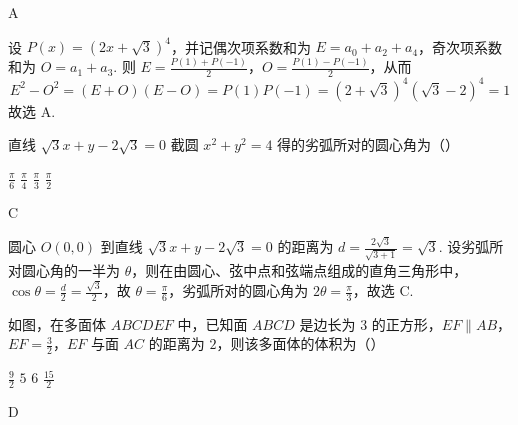 \documentclass[UTF8,a4paper,oneside,11pt]{ctexbook}
\begin{document}
\begin{answer}
A
\end{answer}

\begin{solution}
设 \(P(x)=(2x+\sqrt{3})^4\)，并记偶次项系数和为 \(E=a_0+a_2+a_4\)，奇次项系数和为 \(O=a_1+a_3\). 则
\(E=\frac{P(1)+P(-1)}{2}\)，\(O=\frac{P(1)-P(-1)}{2}\)，从而
\[
E^2-O^2=(E+O)(E-O)=P(1)P(-1)=(2+\sqrt{3})^4(\sqrt{3}-2)^4=1
\]
故选 A.
\end{solution}

\begin{problem}
直线 \(\sqrt{3}x+y-2\sqrt{3}=0\) 截圆 \(x^{2}+y^{2}=4\) 得的劣弧所对的圆心角为（\quad）

\choices
    {\(\frac{\pi}{6}\)}
    {\(\frac{\pi}{4}\)}
    {\(\frac{\pi}{3}\)}
    {\(\frac{\pi}{2}\)}
\end{problem}

\begin{answer}
C
\end{answer}

\begin{solution}
圆心 \(O(0,0)\) 到直线 \(\sqrt{3}x+y-2\sqrt{3}=0\) 的距离为
\(d=\frac{2\sqrt{3}}{\sqrt{3+1}}=\sqrt{3}\).
设劣弧所对圆心角的一半为 \(\theta\)，则在由圆心、弦中点和弦端点组成的直角三角形中，
\(\cos\theta=\frac{d}{2}=\frac{\sqrt{3}}{2}\)，故 \(\theta=\frac{\pi}{6}\)，劣弧所对的圆心角为 \(2\theta=\frac{\pi}{3}\)，故选 C.
\end{solution}

\begin{problem}
如图，在多面体 \(ABCDEF\) 中，已知面 \(ABCD\) 是边长为 \(3\) 的正方形，\(EF\parallel AB\)，\(EF=\frac{3}{2}\)，\(EF\) 与面 \(AC\) 的距离为 \(2\)，则该多面体的体积为（\quad）


\choices
    {\(\frac{9}{2}\)}
    {\(5\)}
    {\(6\)}
    {\(\frac{15}{2}\)}
\end{problem}

\begin{answer}
D
\end{answer}
\end{document}
